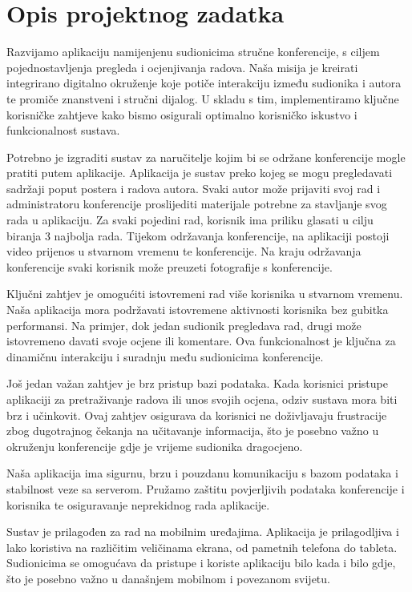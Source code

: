 \chapter{Opis projektnog zadatka}
		
		Razvijamo aplikaciju namijenjenu sudionicima stručne konferencije, s ciljem pojednostavljenja pregleda i ocjenjivanja radova. Naša misija je kreirati integrirano digitalno okruženje koje potiče interakciju između sudionika i autora te promiče znanstveni i stručni dijalog. U skladu s tim, implementiramo ključne korisničke zahtjeve kako bismo osigurali optimalno korisničko iskustvo i funkcionalnost sustava.
		
		Potrebno je izgraditi sustav za naručitelje kojim bi se održane konferencije mogle pratiti putem aplikacije. Aplikacija je sustav preko kojeg se mogu pregledavati sadržaji poput postera i radova autora. Svaki autor može prijaviti svoj rad i administratoru konferencije proslijediti materijale potrebne za stavljanje svog rada u aplikaciju. Za svaki pojedini rad, korisnik ima priliku glasati u cilju biranja 3 najbolja rada. Tijekom održavanja konferencije, na aplikaciji postoji video prijenos u stvarnom vremenu te konferencije. Na kraju održavanja konferencije svaki korisnik može preuzeti fotografije s konferencije.
		
		Ključni zahtjev je omogućiti istovremeni rad više korisnika u stvarnom vremenu. Naša aplikacija mora podržavati istovremene aktivnosti korisnika bez gubitka performansi. Na primjer, dok jedan sudionik pregledava rad, drugi može istovremeno davati svoje ocjene ili komentare. Ova funkcionalnost je ključna za dinamičnu interakciju i suradnju među sudionicima konferencije.
		
		Još jedan važan zahtjev je brz pristup bazi podataka. Kada korisnici pristupe aplikaciji za pretraživanje radova ili unos svojih ocjena, odziv sustava mora biti brz i učinkovit. Ovaj zahtjev osigurava da korisnici ne doživljavaju frustracije zbog dugotrajnog čekanja na učitavanje informacija, što je posebno važno u okruženju konferencije gdje je vrijeme sudionika dragocjeno.
		
		Naša aplikacija ima sigurnu, brzu i pouzdanu komunikaciju s bazom podataka i stabilnost veze sa serverom. Pružamo zaštitu povjerljivih podataka konferencije i korisnika te osiguravanje neprekidnog rada aplikacije.
		
		\newpage
		
		Sustav je prilagođen za rad na mobilnim uređajima. Aplikacija je prilagodljiva i lako koristiva na različitim veličinama ekrana, od pametnih telefona do tableta. Sudionicima se omogućava da pristupe i koriste aplikaciju bilo kada i bilo gdje, što je posebno važno u današnjem mobilnom i povezanom svijetu.
		
